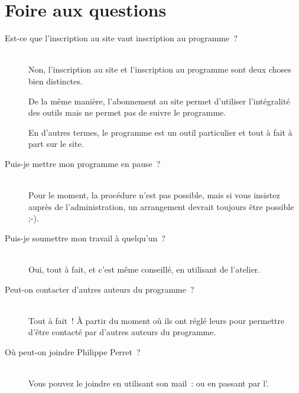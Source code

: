 % 
% 
% 
% 
% 
% 
% 
% 

\section{Foire aux questions}\hypertarget{faq}{}\label{faq}

\begin{description}
\item[Est-ce que l'inscription au site vaut inscription au programme~{}?] \hfill \\
 Non, l'inscription au site \boa{} et l'inscription au programme \unan{} sont deux choses bien distinctes.



De la même manière, l'abonnement au site permet d'utiliser l'intégralité des outils mais ne permet pas de suivre le programme.



En d'autres termes, le programme \unan{} est un outil particulier et tout à fait à part sur le site.



\item[Puis-je mettre mon programme en pause~{}?] \hfill \\
 Pour le moment, la procédure n'est pas possible, mais si vous insistez auprès de l'administration, un arrangement devrait toujours être possible ;-).



\item[Puis-je soumettre mon travail à quelqu'un~{}?] \hfill \\
 Oui, tout à fait, et c'est même conseillé, en utilisant \leForum{} de l'atelier.



\item[Peut-on contacter d'autres auteurs du programme~{}?] \hfill \\
 Tout à fait~{}! À partir du moment où ils ont réglé leurs \preferences{} pour permettre d'être contacté par d'autres auteurs du programme.



\item[Où peut-on joindre Philippe Perret~{}?] \hfill \\
 Vous pouvez le joindre en utilisant son mail~{}:  ou en passant par l'.
\end{description}

